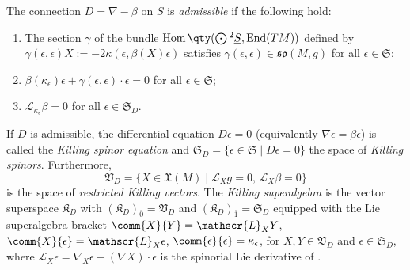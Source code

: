 \documentclass[pdftex]{sigma}
\numberwithin{equation}{section}
\newcommand{\fso}{\mathfrak{so}}
\newcommand{\fX}{\mathfrak{X}}
\newcommand{\fK}{\mathfrak{K}}
\newcommand{\fS}{\mathfrak{S}}
\newcommand{\fV}{\mathfrak{V}}
\newcommand{\eL}{\mathscr{L}}
\newcommand{\Sbundle}{\underline{S}}
\newcommand{\Odot}{\mathchoice{{\textstyle\bigodot}}{\bigodot}{\bigodot}{\bigodot}}
\newcommand{\1}{\mathbbm{1}}
\DeclareMathOperator{\End}{End}
\DeclareMathOperator{\Hom}{Hom}
\begin{document}
\begin{Definition}\label{def:killing-spinor}
	The connection $D=\nabla-\beta$ on $\Sbundle$ is \emph{admissible} if the following hold:
	\begin{enumerate}\itemsep=0pt
		\item The section $\gamma$ of the bundle $\Hom\qty(\Odot^2\Sbundle,\End(TM))$ defined by $\gamma(\epsilon,\epsilon)X := - 2\kappa(\epsilon,\beta(X)\epsilon)$ satisfies $\gamma(\epsilon,\epsilon)\in\fso(M,g)$ for all $\epsilon\in\fS$; %
		\item $\beta(\kappa_\epsilon)\epsilon
				+ \gamma(\epsilon,\epsilon)\cdot\epsilon
				= 0$ for all $\epsilon\in\fS$; %
		\item $\eL_{\kappa_\epsilon}\beta = 0$ for all $\epsilon\in\fS_D$. %
	\end{enumerate}
	If $D$ is admissible, the differential equation $D\epsilon=0$ (equivalently $\nabla\epsilon =\beta\epsilon$) is called the \emph{Killing spinor equation} and
$
		\fS_D = \{\epsilon\in\fS \mid D\epsilon = 0\}
$
	the space of \emph{Killing spinors}. Furthermore,
\[
		\fV_D = \{X\in \fX(M) \mid \eL_Xg =0,\, \eL_X\beta = 0\}
\]
	is the space of \emph{restricted Killing vectors}. The \emph{Killing superalgebra} is the vector superspace $\fK_D$ with $(\fK_D)_{\overline 0}=\fV_D$ and $(\fK_D)_{\overline 1}=\fS_D$ equipped with the Lie superalgebra bracket
$\comm{X}{Y} = \eL_X Y$,
$\comm{X}{\epsilon} = \eL_X \epsilon$,
$\comm{\epsilon}{\epsilon} = \kappa_\epsilon$,
	for $X,Y\in\fV_D$ and $\epsilon\in\fS_D$, where $\eL_X \epsilon=\nabla_X\epsilon - (\nabla X)\cdot\epsilon$ is the spinorial Lie derivative of \cite{Kosmann1971}.
\end{Definition}
\end{document}
